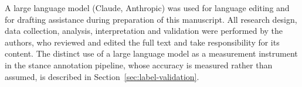 \documentclass[pdflatex,sn-basic,Numbered,iicol]{sn-jnl}
\begin{document}
A large language model (Claude, Anthropic) was used for language editing and for
drafting assistance during preparation of this manuscript. All research design,
data collection, analysis, interpretation and validation were performed by the
authors, who reviewed and edited the full text and take responsibility for its
content. The distinct use of a large language model as a measurement instrument
in the stance annotation pipeline, whose accuracy is measured rather than
assumed, is described in Section~\ref{sec:label-validation}.


\end{document}
